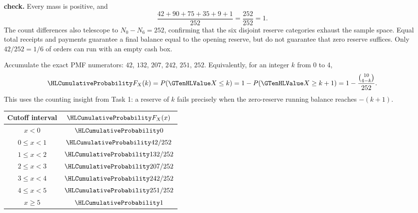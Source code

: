 \textbf{ check.} Every mass is positive, and
\[
\frac{42+90+75+35+9+1}{252}=\frac{252}{252}=1.
\]
The count differences also telescope to $N_0-N_6=252$, confirming that the six disjoint reserve categories exhaust the sample space. Equal total receipts and payments guarantee a final balance equal to the opening reserve, but do not guarantee that zero reserve suffices. Only $42/252=1/6$ of orders can run with an empty cash box.

\clearpage
{}
Accumulate the exact PMF numerators: $42$, $132$, $207$, $242$, $251$, $252$. Equivalently, for an integer $k$ from 0 to 4,
\[
\cTwoCDFHL{F_X(k)}=P(\cTwoValue{X}\leq k)=1-P(\cTwoValue{X}\geq k+1)
=1-\frac{\binom{10}{4-k}}{252}.
\]
This uses the counting insight from Task 1: a reserve of $k$ fails precisely when the zero-reserve running balance reaches $-(k+1)$.

\begin{center}\begin{tabular}{cc}\toprule
Cutoff interval & $\cTwoCDFHL{F_X(x)}$ \\\midrule
$x<0$ & $\cTwoCDFHL{0}$ \\
$0\leq x<1$ & $\cTwoCDFHL{42/252}$ \\
$1\leq x<2$ & $\cTwoCDFHL{132/252}$ \\
$2\leq x<3$ & $\cTwoCDFHL{207/252}$ \\
$3\leq x<4$ & $\cTwoCDFHL{242/252}$ \\
$4\leq x<5$ & $\cTwoCDFHL{251/252}$ \\
$x\geq5$ & $\cTwoCDFHL{1}$ \\\bottomrule
\end{tabular}\end{center}

